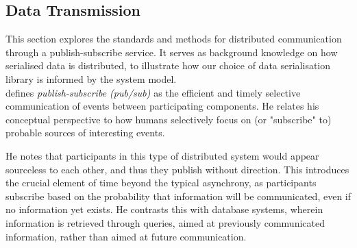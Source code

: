 \documentclass[../report.tex]{subfiles}
\begin{document}







\subsection{Data Transmission} %

This section explores the standards and methods for distributed communication through a publish-subscribe service. It serves as background knowledge on how serialised data is distributed, to illustrate how our choice of data serialisation library is informed by the system model. \\

\cite{tarkoma2012publish} defines \textit{publish-subscribe (pub/sub)} as the efficient and timely selective communication of events between participating components. He relates his conceptual perspective to how humans selectively focus on (or "subscribe" to) probable sources of interesting events.

He notes that participants in this type of distributed system would appear sourceless to each other, and thus they publish without direction. This introduces the crucial element of time beyond the typical asynchrony, as participants subscribe based on the probability that information will be communicated, even if no information yet exists. He contrasts this with database systems, wherein information is retrieved through queries, aimed at previously communicated information, rather than aimed at future communication. \\
\end{document}
